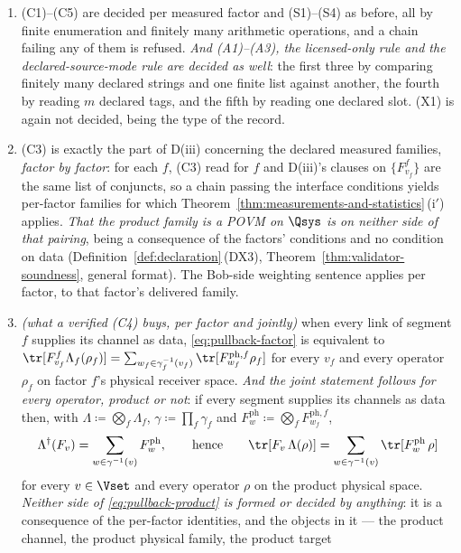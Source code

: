 \begin{theorem}
\begin{enumerate}[label=(\roman*$'$),leftmargin=2.6em]
\item (C1)--(C5) are decided per measured factor and (S1)--(S4) as before, all
by finite enumeration and finitely many arithmetic operations, and a chain
failing any of them is refused.
\emph{And (A1)--(A3), the licensed-only rule and the declared-source-mode
rule are decided as well}: the first three by comparing finitely many declared
strings and one finite list against another, the fourth by reading $m$
declared tags, and the fifth by reading one declared slot. (X1) is again not
decided, being the type of the record.
\item (C3) is exactly the part of D(iii) concerning the declared measured
families, \emph{factor by factor}: for each $f$, (C3) read for $f$ and
D(iii)'s clauses on $\{F^{f}_{v_f}\}$ are the same list of conjuncts, so a
chain passing the interface conditions yields per-factor families for which
Theorem~\ref{thm:measurements-and-statistics}\,(i$'$) applies. \emph{That the product family is a POVM on
$\Qsys$ is on neither side of that pairing}, being a consequence of the
factors' conditions and no condition on data
(Definition~\ref{def:declaration}\,(DX3), Theorem~\ref{thm:validator-soundness}, general
format). The Bob-side weighting sentence applies per factor, to that factor's
delivered family.
\item \emph{(what a verified (C4) buys, per factor and jointly)} when every
link of segment $f$ supplies its channel as data,
\eqref{eq:pullback-factor} is equivalent to
$\tr[F^{f}_{v_f}\Lambda_f(\rho_f)]
=\sum_{w_f\in\gamma_f^{-1}(v_f)}\tr[F^{\mathrm{ph},f}_{w_f}\rho_f]$ for every
$v_f$ and every operator $\rho_f$ on factor $f$'s physical receiver space.
\emph{And the joint statement follows for every operator, product or not}: if
every segment supplies its channels as data then, with
$\Lambda\coloneqq\bigotimes_f\Lambda_f$, $\gamma\coloneqq\prod_f\gamma_f$ and
$F^{\mathrm{ph}}_w\coloneqq\bigotimes_fF^{\mathrm{ph},f}_{w_f}$,
\begin{equation}\label{eq:pullback-product}
  \Lambda^{\dagger}(F_v)=\sum_{w\in\gamma^{-1}(v)}F^{\mathrm{ph}}_w ,
  \qquad\text{hence}\qquad
  \tr[F_v\,\Lambda(\rho)]=\sum_{w\in\gamma^{-1}(v)}\tr[F^{\mathrm{ph}}_w\,\rho]
\end{equation}
for every $v\in\Vset$ and every operator $\rho$ on the product physical space.
\emph{Neither side of \eqref{eq:pullback-product} is formed or decided by
anything}: it is a consequence of the per-factor identities, and the objects in
it --- the product channel, the product physical family, the product target

\end{enumerate}
\end{theorem}
